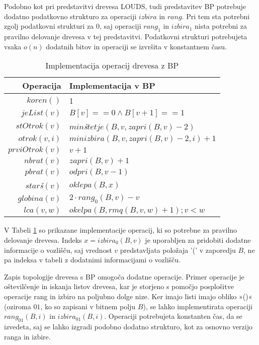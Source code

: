 Podobno kot pri predstavitvi drevesa LOUDS, tudi predstavitev BP potrebuje dodatno podatkovno strukturo za operaciji $izbira$ in $rang$. Pri tem sta potrebni zgolj podatkovni strukturi za $0$, saj  operaciji $rang_1$ in $izbira_1$ nista potrebni za pravilno delovanje drevesa v tej predstavitvi. Podatkovni strukturi potrebujeta vsaka $o(n)$ dodatnih bitov in operaciji se izvršita v konstantnem času.

\begin{table}[htb]
    \centering
      \caption{Implementacija operacij drevesa z BP}
    \begin{tabular}{r|l}
\textbf{Operacija}& \textbf{Implementacija v BP} \\\hline
         $koren()$& 1\\
         $jeList(v)$& $B[v]==0 \wedge B[v+1]==1$\\
         $stOtrok(v)$& $min$\textit{š}$tetje(B,v,zapri(B,v)-2)$\\
         $otrok(v,i)$&  $minizbira(B,v,zapri(B,v)-2,i)+1$\\
         $prviOtrok(v)$& $v+1$\\
         $nbrat(v)$& $zapri(B,v)+1$ \\
         $pbrat(v)$& $odpri(B,v-1)$ \\
         $star$\textit{š}$(v)$& $oklepa(B,x)$ \\
         $globina(v)$& $2\cdot rang_0(B,v)-v$ \\
         $lca(v,w)$&  $okelpa(B,rmq(B,v,w)+1);v<w$\\
    \end{tabular}  
    \label{tab:BPop}
\end{table}

V Tabeli \ref{tab:BPop} so prikazane implementacije operacij, ki so potrebne za pravilno delovanje drevesa. Indeks $x=izbira_0(B,v)$ je uporabljen za pridobiti dodatne informacije o vozlišču, saj vrednost $v$ predstavljata položaja '(' v zaporedju $B$, ne pa indeksa v tabeli z dodatnimi informacijami o vozlišču.

Zapis topologije drevesa s BP omogoča dodatne operacije. Primer operacije je oštevilčenje in iskanja listov drevesa, kar je storjeno s pomočjo posplošitve operacije rang in izbiro na poljubno dolge nize. Ker imajo listi imajo obliko »()« (oziroma $01$, ko so zapisani v bitnem polju $B$), se lahko implementirata operaciji $rang_{01}(B,i)$ in $izbira_{01}(B,i)$. Operaciji potrebujeta konstanten čas, da se izvedeta, saj se lahko izgradi podobno dodatno strukturo, kot za osnovno verzijo ranga in izbire.
